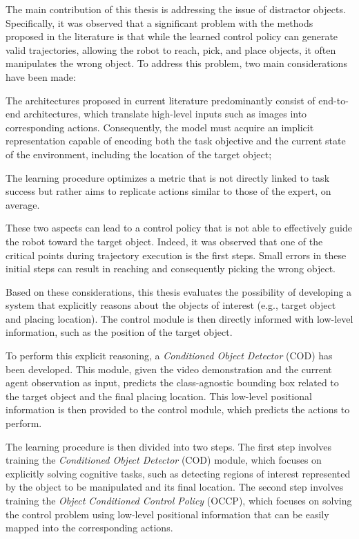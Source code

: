 The main contribution of this thesis is addressing the issue of distractor objects. Specifically, it was observed that a significant problem with the methods proposed in the literature is that while the learned control policy can generate valid trajectories, allowing the robot to reach, pick, and place objects, it often manipulates the wrong object. To address this problem, two main considerations have been made:

\begin{enumerate*}[label=\textbf{(\arabic*)}]
\item The architectures proposed in current literature predominantly consist of end-to-end architectures, which translate high-level inputs such as images into corresponding actions. Consequently, the model must acquire an implicit representation capable of encoding both the task objective and the current state of the environment, including the location of the target object;
\item The learning procedure optimizes a metric that is not directly linked to task success but rather aims to replicate actions similar to those of the expert, on average.
\end{enumerate*}

These two aspects can lead to a control policy that is not able to effectively guide the robot toward the target object. Indeed, it was observed that one of the critical points during trajectory execution is the first steps. Small errors in these initial steps can result in reaching and consequently picking the wrong object.

Based on these considerations, this thesis evaluates the possibility of developing a system that explicitly reasons about the objects of interest (e.g., target object and placing location). The control module is then directly informed with low-level information, such as the position of the target object.

To perform this explicit reasoning, a \textit{Conditioned Object Detector} (COD) has been developed. This module, given the video demonstration and the current agent observation as input, predicts the class-agnostic bounding box related to the target object and the final placing location. This low-level positional information is then provided to the control module, which predicts the actions to perform.

The learning procedure is then divided into two steps. The first step involves training the \textit{Conditioned Object Detector} (COD) module, which focuses on explicitly solving cognitive tasks, such as detecting regions of interest represented by the object to be manipulated and its final location. The second step involves training the \textit{Object Conditioned Control Policy} (OCCP), which focuses on solving the control problem using low-level positional information that can be easily mapped into the corresponding actions.

